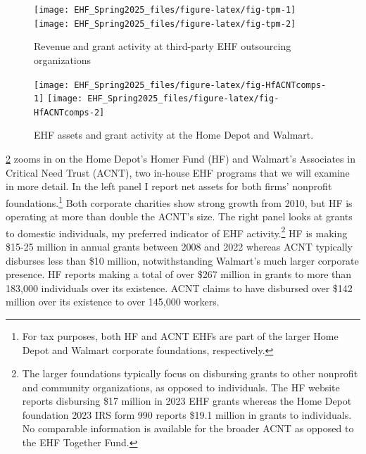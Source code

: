 \documentclass[
  11pt,
  oneside]{article}
\begin{document}
\begin{figure}
\texttt{[image: EHF\_Spring2025\_files/figure-latex/fig-tpm-1]} \texttt{[image: EHF\_Spring2025\_files/figure-latex/fig-tpm-2]} \caption{Revenue and grant activity at third-party EHF outsourcing organizations}\label{fig:fig-tpm}
\end{figure}

\begin{figure}
\texttt{[image: EHF\_Spring2025\_files/figure-latex/fig-HfACNTcomps-1]} \texttt{[image: EHF\_Spring2025\_files/figure-latex/fig-HfACNTcomps-2]} \caption{EHF assets and grant activity at the Home Depot and Walmart.}\label{fig:fig-HfACNTcomps}
\end{figure}

\ref{fig:fig-HfACNTcomps} zooms in on the Home Depot's Homer Fund (HF) and Walmart's Associates in Critical Need Trust (ACNT), two in-house EHF programs that we will examine in more detail. In the left panel I report net assets for both firms' nonprofit foundations.\footnote{For tax purposes, both HF and ACNT EHFs are part of the larger Home Depot and Walmart corporate foundations, respectively.} Both corporate charities show strong growth from 2010, but HF is operating at more than double the ACNT's size. The right panel looks at grants to domestic individuals, my preferred indicator of EHF activity.\footnote{The larger foundations typically focus on disbursing grants to other nonprofit and community organizations, as opposed to individuals. The HF website reports disbursing \$17 million in 2023 EHF grants whereas the Home Depot foundation 2023 IRS form 990 reports \$19.1 million in grants to individuals. No comparable information is available for the broader ACNT as opposed to the EHF Together Fund.} HF is making \$15-25 million in annual grants between 2008 and 2022 whereas ACNT typically disburses less than \$10 million, notwithstanding Walmart's much larger corporate presence. HF reports making a total of over \$267 million in grants to more than 183,000 individuals over its existence. ACNT claims to have disbursed over \$142 million over its existence to over 145,000 workers.
\end{document}

